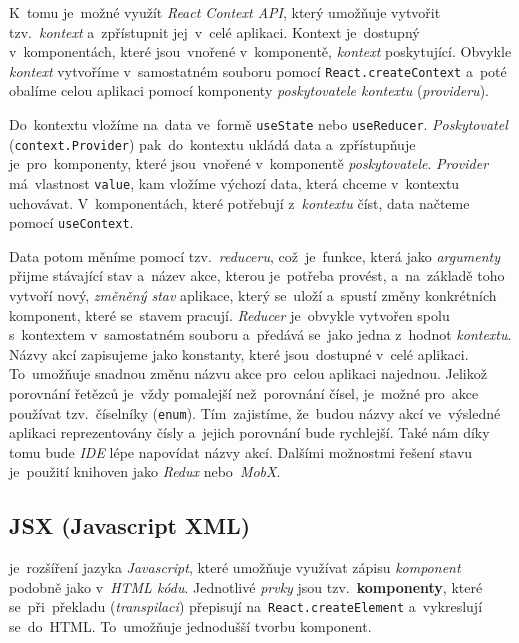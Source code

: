 \documentclass[10pt,a4paper]{article}
\begin{document}
        K~tomu je~možné využít \emph{React Context API}, který umožňuje vytvořit tzv.~\emph{kontext} a~zpřístupnit jej~v~celé aplikaci. Kontext je~dostupný v~komponentách, které jsou~vnořené v~komponentě, \emph{kontext} poskytující. Obvykle \emph{kontext} vytvoříme v~samostatném souboru pomocí \texttt{React.createContext} a~poté obalíme celou aplikaci pomocí komponenty \emph{poskytovatele kontextu} (\emph{provideru}).
        
        Do~kontextu vložíme  na~data ve~formě \texttt{useState} nebo \texttt{useReducer}. \emph{Poskytovatel} (\texttt{context.Provider}) pak~do~kontextu ukládá data a~zpřístupňuje je~pro~komponenty, které jsou~vnořené v~komponentě \emph{poskytovatele}. \cite{hswolff:reactContextReducer}
        \emph{Provider} má~vlastnost \texttt{value}, kam vložíme výchozí data, která chceme v~kontextu uchovávat. V~komponentách, které potřebují z~\emph{kontextu} číst, data načteme pomocí \texttt{useContext}.
        
        Data potom měníme pomocí tzv.~\emph{reduceru}, což~je~funkce, která jako \emph{argumenty} přijme stávající stav a~název akce, kterou je~potřeba provést, a~na~základě toho vytvoří nový, \emph{změněný stav} aplikace, který se~uloží a~spustí změny konkrétních komponent, které se~stavem pracují. \emph{Reducer} je~obvykle vytvořen spolu s~kontextem v~samostatném souboru a~předává se~jako jedna z~hodnot \emph{kontextu}. Názvy akcí zapisujeme jako konstanty, které jsou~dostupné v~celé aplikaci. To~umožňuje snadnou změnu názvu akce pro~celou aplikaci najednou. Jelikož porovnání řetězců je~vždy pomalejší než~porovnání čísel, je~možné pro~akce používat tzv.~číselníky (\texttt{enum}). Tím~zajistíme, že~budou názvy akcí ve~výsledné aplikaci reprezentovány čísly a~jejich porovnání bude rychlejší. Také nám díky tomu bude \emph{IDE} lépe napovídat názvy akcí. Dalšími možnostmi řešení stavu je~použití knihoven jako \emph{Redux} nebo~\emph{MobX}.

        \subsection{JSX (Javascript XML)} je~rozšíření jazyka \emph{Javascript}, které umožňuje využívat zápisu \emph{komponent} podobně jako v~\emph{HTML kódu}. Jednotlivé \emph{prvky} jsou tzv.~\textbf{komponenty}, které se~při~překladu (\emph{transpilaci}) přepisují na~\texttt{React.createElement} a~vykreslují se~do~HTML. To~umožňuje jednodušší tvorbu komponent. \cite{reactJSX}
        
\end{document}
